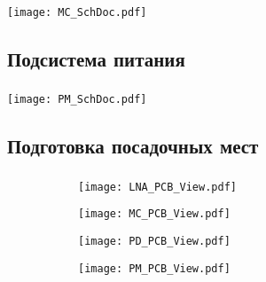 \documentclass[c]{beamer}  %
\begin{document}
	\begin{frame}
		\frametitle{\insertsection}
		\framesubtitle{\insertsubsection}
		\centering
		\texttt{[image: MC\_SchDoc.pdf]}	
	\end{frame}
	
\subsection{Подсистема питания}
	
	\begin{frame}
		\frametitle{\insertsection}
		\framesubtitle{\insertsubsection}
		\centering
		\texttt{[image: PM\_SchDoc.pdf]}	
	\end{frame}

\subsection{Подготовка посадочных мест}

	\begin{frame}
		\frametitle{\insertsection}
		\framesubtitle{\insertsubsection}
		\begin{center}
			\begin{figure}
				\begin{subfigure}[t]{0.5\textwidth}
					\texttt{[image: LNA\_PCB\_View.pdf]}
				\end{subfigure}%
				\begin{subfigure}[t]{0.5\textwidth}
					\texttt{[image: MC\_PCB\_View.pdf]}
				\end{subfigure}
				
				\begin{subfigure}[b]{0.5\textwidth}
					\texttt{[image: PD\_PCB\_View.pdf]}
				\end{subfigure}%
				\begin{subfigure}[b]{0.5\textwidth}
					\texttt{[image: PM\_PCB\_View.pdf]}
				\end{subfigure}
			\end{figure}
		\end{center}
	\end{frame}
\end{document}
